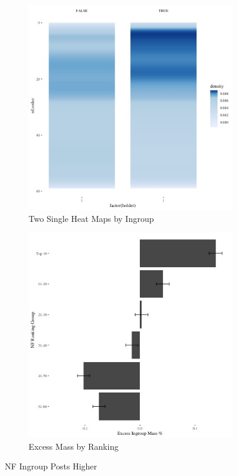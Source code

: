 \documentclass[12pt,letterpaper]{article}
\begin{document}
\begin{figure}[ht]

    \begin{subfigure}{.5\textwidth} 
        \centering
        \includegraphics[width=1\linewidth]{Output/Graphs/Audit/Heatmaps/US NF nf rank by ingroup - smooth.jpg}  
        \caption{Two Single Heat Maps by Ingroup}
        \label{fig:sub-first}
        \end{subfigure}
    \begin{subfigure}{.5\textwidth}
        \centering
        \includegraphics[width=.9\linewidth]{Output/Graphs/Audit/Excess Mass/US NF excess mass by ranking group.jpg}  
        \caption{Excess Mass by Ranking}
        \label{fig:sub-second}
    \end{subfigure}
\caption{NF Ingroup Posts Higher}
\end{figure}
\end{document}
